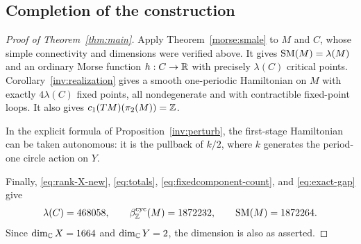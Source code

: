 \subsection{Completion of the construction}
\begin{proof}[Proof of Theorem~\ref{thm:main}]
Apply Theorem~\ref{morse:smale} to $M$ and $C$, whose simple
connectivity and dimensions were verified above. It gives
$\operatorname{SM}(M)=\lambda(M)$ and an ordinary Morse function
$h:C\to\mathbb R$ with precisely $\lambda(C)$ critical points.
Corollary~\ref{inv:realization} gives a smooth one-periodic
Hamiltonian on $M$ with exactly $4\lambda(C)$ fixed points, all
nondegenerate and with contractible fixed-point loops. It also gives
$c_1(TM)(\pi_2(M))=\mathbb Z$.

In the explicit formula of Proposition~\ref{inv:perturb}, the
first-stage Hamiltonian can be taken autonomous: it is the pullback
of $k/2$, where $k$ generates the period-one circle action on $Y$.

Finally, \eqref{eq:rank-X-new}, \eqref{eq:totals},
\eqref{eq:fixedcomponent-count}, and \eqref{eq:exact-gap} give
\[
 \lambda(C)=468058,\qquad
 \beta_{\mathbb Z}^{\mathrm{cyc}}(M)=1872232,\qquad
 \operatorname{SM}(M)=1872264.
\]
Since $\dim_{\mathbb C}X=1664$ and $\dim_{\mathbb C}Y=2$, the dimension is
also as asserted.
\end{proof}
